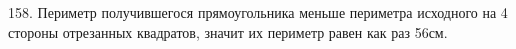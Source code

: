 158. Периметр получившегося прямоугольника меньше периметра исходного на 4 стороны отрезанных квадратов, значит их периметр равен как раз 56см.\\
